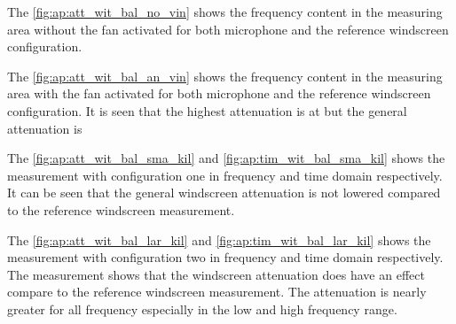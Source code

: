 The \autoref{fig:ap:att_wit_bal_no_vin} shows the frequency content in the measuring area without the fan activated for both microphone and the reference windscreen configuration.

The \autoref{fig:ap:att_wit_bal_an_vin} shows the frequency content in the measuring area with the fan activated for both microphone and the reference windscreen configuration. It is seen that the highest attenuation is at  but the general attenuation is 



The \autoref{fig:ap:att_wit_bal_sma_kil} and \autoref{fig:ap:tim_wit_bal_sma_kil} shows the measurement with configuration one in frequency and time domain respectively. It can be seen that the general windscreen attenuation is not lowered compared to the reference windscreen measurement.



The \autoref{fig:ap:att_wit_bal_lar_kil} and \autoref{fig:ap:tim_wit_bal_lar_kil} shows the measurement with configuration two in frequency and time domain respectively. The measurement shows that the windscreen attenuation does have an effect compare to the reference windscreen measurement. The attenuation is nearly greater for all frequency especially in the low and high frequency range.


